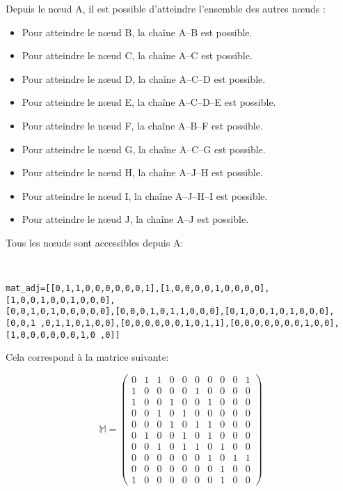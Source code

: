 \ifprof
\begin{corrige}
Depuis le n\oe{}ud A, il est possible d'atteindre l'ensemble des autres n\oe{}uds :
\begin{itemize}
\item Pour atteindre le n\oe{}ud B, la chaîne A--B est possible.
\item Pour atteindre le n\oe{}ud C, la chaîne A--C est possible.
\item Pour atteindre le n\oe{}ud D, la chaîne A--C--D est possible.
\item Pour atteindre le n\oe{}ud E, la chaîne A--C--D--E est possible.
\item Pour atteindre le n\oe{}ud F, la chaîne A--B--F est possible.
\item Pour atteindre le n\oe{}ud G, la chaîne A--C--G est possible.
\item Pour atteindre le n\oe{}ud H, la chaîne A--J--H est possible.
\item Pour atteindre le n\oe{}ud I, la chaîne A--J--H--I est possible.
\item Pour atteindre le n\oe{}ud J, la chaîne A--J est possible.
\end{itemize}

Tous les n\oe{}uds sont accessibles depuis A: \\
\end{corrige}
\else
\fi

\ifprof
\begin{corrige}~\\
\begin{lstlisting}
mat_adj=[[0,1,1,0,0,0,0,0,0,1],[1,0,0,0,0,1,0,0,0,0],[1,0,0,1,0,0,1,0,0,0],
[0,0,1,0,1,0,0,0,0,0],[0,0,0,1,0,1,1,0,0,0],[0,1,0,0,1,0,1,0,0,0],
[0,0,1 ,0,1,1,0,1,0,0],[0,0,0,0,0,0,1,0,1,1],[0,0,0,0,0,0,0,1,0,0],
[1,0,0,0,0,0,0,1,0 ,0]]
\end{lstlisting}

Cela correspond à la matrice suivante:

\[ \mathbb{M}=\left(\begin{array}{cccccccccc}
0 & 1 & 1 & 0 & 0 & 0 & 0 & 0 & 0 & 1 \\ 
1 & 0 & 0 & 0 & 0 & 1 & 0 & 0 & 0 & 0 \\ 
1 & 0 & 0 & 1 & 0 & 0 & 1 & 0 & 0 & 0 \\ 
0 & 0 & 1 & 0 & 1 & 0 & 0 & 0 & 0 & 0 \\ 
0 & 0 & 0 & 1 & 0 & 1 & 1 & 0 & 0 & 0 \\ 
0 & 1 & 0 & 0 & 1 & 0 & 1 & 0 & 0 & 0 \\ 
0 & 0 & 1 & 0 & 1 & 1 & 0 & 1 & 0 & 0 \\ 
0 & 0 & 0 & 0 & 0 & 0 & 1 & 0 & 1 & 1 \\ 
0 & 0 & 0 & 0 & 0 & 0 & 0 & 1 & 0 & 0 \\ 
1 & 0 & 0 & 0 & 0 & 0 & 0 & 1 & 0 & 0
\end{array}  \right)  \]

\end{corrige}
\else
\fi



